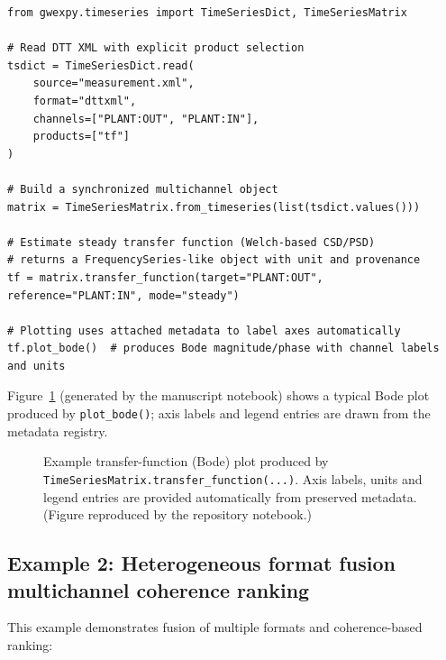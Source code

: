 \documentclass[preprint,12pt,a4paper]{elsarticle}
\begin{document}
\begin{lstlisting}[caption={DTT XML transfer-function workflow (public API)}]
from gwexpy.timeseries import TimeSeriesDict, TimeSeriesMatrix

# Read DTT XML with explicit product selection
tsdict = TimeSeriesDict.read(
    source="measurement.xml",
    format="dttxml",
    channels=["PLANT:OUT", "PLANT:IN"],
    products=["tf"]
)

# Build a synchronized multichannel object
matrix = TimeSeriesMatrix.from_timeseries(list(tsdict.values()))

# Estimate steady transfer function (Welch-based CSD/PSD)
# returns a FrequencySeries-like object with unit and provenance
tf = matrix.transfer_function(target="PLANT:OUT", reference="PLANT:IN", mode="steady")

# Plotting uses attached metadata to label axes automatically
tf.plot_bode()  # produces Bode magnitude/phase with channel labels and units
\end{lstlisting}

Figure~\ref{fig:bode} (generated by the manuscript notebook) shows a typical Bode plot produced by \texttt{plot\_bode()}; axis labels and legend entries are drawn from the metadata registry.

\begin{figure}[htbp]
  \centering
  \caption{Example transfer-function (Bode) plot produced by \texttt{TimeSeriesMatrix.transfer\_function(...)}.  Axis labels, units and legend entries are provided automatically from preserved metadata.  (Figure reproduced by the repository notebook.)}
  \label{fig:bode}
\end{figure}

\subsection{Example 2: Heterogeneous format fusion \textrightarrow{} multichannel coherence ranking}
This example demonstrates fusion of multiple formats and coherence-based ranking:
\end{document}
